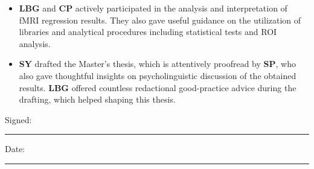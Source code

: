 \begin{declarationcontribution}
\begin{itemize}
    \item \textbf{LBG} and \textbf{CP} actively participated in the analysis and interpretation of fMRI regression results. They also gave useful guidance on the utilization of  libraries and analytical procedures including statistical tests and ROI analysis.
    \item \textbf{SY} drafted the Master's thesis, which is attentively proofread by \textbf{SP}, who also gave thoughtful insights on psycholinguistic discussion of the obtained results. \textbf{LBG} offered countless redactional good-practice advice during the drafting, which helped shaping this thesis. 
    \end{itemize}
     
    \noindent Signed:\\
    \rule[0.5em]{25em}{0.5pt} %
     
    \noindent Date:\\
    \rule[0.5em]{25em}{0.5pt} %
    \end{declarationcontribution}
    
    \cleardoublepage